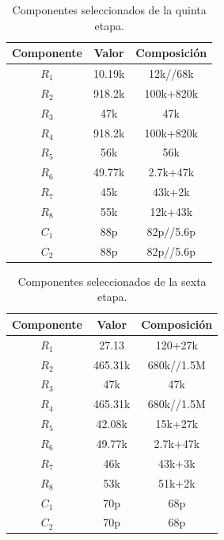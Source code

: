 \begin{table}[H]
\centering
\begin{tabular}{ccc}
\hline
\multicolumn{1}{c}{Componente} & \multicolumn{1}{c}{Valor} & Composición \\ \hline
$R_1$                           & 10.19k                     & 12k//68k    \\
$R_2$                           & 918.2k                     & 100k+820k   \\
$R_3$                           & 47k                        & 47k         \\
$R_4$                           & 918.2k                     & 100k+820k   \\
$R_5$                           & 56k                        & 56k         \\
$R_6$                           & 49.77k                     & 2.7k+47k    \\
$R_7$                           & 45k                        & 43k+2k         \\
$R_8$                           & 55k                        & 12k+43k         \\
$C_1$                           & 88p                      & 82p//5.6p    \\
$C_2$                           & 88p                      & 82p//5.6p   \\
\hline
\end{tabular}
\caption{Componentes seleccionados de la quinta etapa.}
\end{table}

\begin{table}[H]
\centering
\begin{tabular}{ccc}
\hline
\multicolumn{1}{c}{Componente} & \multicolumn{1}{c}{Valor} & Composición \\ \hline
$R_1$                           & 27.13                      & 120+27k     \\
$R_2$                           & 465.31k                    & 680k//1.5M  \\
$R_3$                           & 47k                        & 47k         \\
$R_4$                           & 465.31k                    & 680k//1.5M  \\
$R_5$                           & 42.08k                     & 15k+27k     \\
$R_6$                           & 49.77k                     & 2.7k+47k    \\
$R_7$                           & 46k                        & 43k+3k         \\
$R_8$                           & 53k                        & 51k+2k         \\
$C_1$                           & 70p                       & 68p        \\
$C_2$                           & 70p                       & 68p  \\
\hline
\end{tabular}
\caption{Componentes seleccionados de la sexta etapa.}
\end{table}
